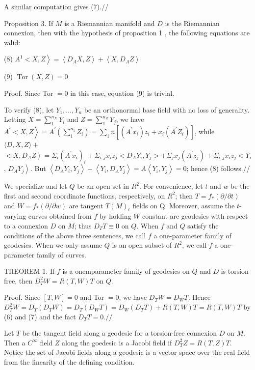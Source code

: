 \documentclass[10pt]{article}
\begin{document}
A similar computation gives (7).//

Proposition 3. If $M$ is a Riemannian manifold and $D$ is the Riemannian connexion, then with the hypothesis of proposition 1 , the following equations are valid:

(8) $\left.A^{1}<X, Z\right\rangle=\left\langle D_{A} X, Z\right\rangle+\left\langle X, D_{A} Z\right\rangle$

(9) $\operatorname{Tor}(X, Z)=0$

Proof. Since Tor $=0$ in this case, equation (9) is trivial.

To verify (8), let $Y_{1}, \ldots, Y_{n}$ be an orthonormal base field with no loss of generality. Letting $X=\sum_{1}^{n_{X}} Y_{i}$ and $Z=\sum_{1}^{n_{Z}} Y_{j}$, we have $\left.A^{\prime}<X, Z\right\rangle=A^{\prime}\left(\sum_{1}^{n_{1}} Z_{i}\right)=\sum_{1} n\left[\left(A^{\prime} x_{i}\right) z_{i}+x_{i}\left(A^{\prime} Z_{i}\right)\right]$, while $\langle D, X, Z\rangle+$ $\left.<X, D_{A} Z\right\rangle=\Sigma_{i}\left(A^{\prime} x_{i}\right)_{i}+\Sigma_{i, j} x_{i} z_{j}<D_{A} Y_{i}, Y_{j}>+\Sigma_{j} x_{j}\left(A^{\prime} z_{j}\right)+\Sigma_{i, j} x_{i} z_{j}<Y_{i}$, $\left.D_{A} Y_{j}\right\rangle .$ But $\left\langle D_{A} Y_{i}, Y_{j}\right\rangle+\left\langle Y_{i}, D_{A} Y_{j}\right\rangle=A\left\langle Y_{i}, Y_{j}\right\rangle=0$; hence (8) follows.//

We specialize and let $Q$ be an open set in $R^{2}$. For convenience, let $t$ and $w$ be the first and second coordinate functions, respectively, on $R^{2}$; then $T=f_{*}(\partial / \partial t)$ and $W=f_{*}(\partial / \partial w)$ are tangent $T(M)_{t}$ fields on Q. Moreover, assume the $t$-varying curves obtained from $f$ by holding $W$ constant are geodesics with respect to a connexion $D$ on $M$; thus $D_{T} T \equiv 0$ on $Q$. When $f$ and $Q$ satisfy the conditions of the above three sentences, we call $f$ a one-parameter family of geodesics. When we only assume $Q$ is an open subset of $R^{2}$, we call $f$ a one-parameter family of curves.

THEOREM 1. If $f$ is a onemparameter family of geodesics on $Q$ and $D$ is torsion free, then $D_{T}^{2} W=R(T, W) T$ on $Q .$

Proof. Since $[T, W]=0$ and Tor $=0$, we have $D_{T} W=D_{W} T$. Hence $D_{T}^{2} W=D_{T}\left(D_{T} W\right)=D_{T}\left(D_{W} T\right)=D_{W}\left(D_{T} T\right)+R(T, W) T=R(T, W) T$ by (6) and (7) and the fact $D_{T} T=0 . / /$

Let $T$ be the tangent field along a geodesic for a torsion-free connexion $D$ on $M$. Then a $C^{\infty}$ field $Z$ along the goedesic is a Jacobi field if $D_{T}^{2} Z=R(T, Z) T$. Notice the set of Jacobi fields along a geodesic is a vector space over the real field from the linearity of the defining condition.
\end{document}
